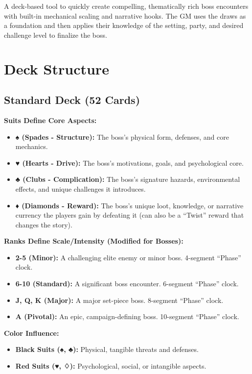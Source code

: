A deck-based tool to quickly create compelling, thematically rich boss encounters with built-in mechanical scaling and narrative hooks. The GM uses the draws as a foundation and then applies their knowledge of the setting, party, and desired challenge level to finalize the boss.

\section{Deck Structure}

\subsection{Standard Deck (52 Cards)}

\textbf{Suits Define Core Aspects:}
\begin{itemize}
    \item \textbf{♠ (Spades - Structure):} The boss's physical form, defenses, and core mechanics.
    \item \textbf{♥ (Hearts - Drive):} The boss's motivations, goals, and psychological core.
    \item \textbf{♣ (Clubs - Complication):} The boss's signature hazards, environmental effects, and unique challenges it introduces.
    \item \textbf{♦ (Diamonds - Reward):} The boss's unique loot, knowledge, or narrative currency the players gain by defeating it (can also be a ``Twist'' reward that changes the story).
\end{itemize}

\textbf{Ranks Define Scale/Intensity (Modified for Bosses):}
\begin{itemize}
    \item \textbf{2-5 (Minor):} A challenging elite enemy or minor boss. 4-segment ``Phase'' clock.
    \item \textbf{6-10 (Standard):} A significant boss encounter. 6-segment ``Phase'' clock.
    \item \textbf{J, Q, K (Major):} A major set-piece boss. 8-segment ``Phase'' clock.
    \item \textbf{A (Pivotal):} An epic, campaign-defining boss. 10-segment ``Phase'' clock.
\end{itemize}

\textbf{Color Influence:}
\begin{itemize}
    \item \textbf{Black Suits (♠, ♣):} Physical, tangible threats and defenses.
    \item \textbf{Red Suits (♥, ♢):} Psychological, social, or intangible aspects.
\end{itemize}

